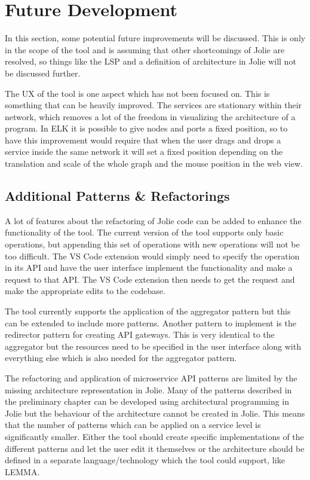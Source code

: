 \section{Future Development}
In this section, some potential future improvements will be discussed.
This is only in the scope of the tool and is assuming that other shortcomings of Jolie are resolved, so things like the LSP and a definition of architecture in Jolie will not be discussed further.

The UX of the tool is one aspect which has not been focused on. This is something that can be heavily improved.
The services are stationary within their network, which removes a lot of the freedom in visualizing the architecture of a program.
In ELK it is possible to give nodes and ports a fixed position, so to have this improvement would require that when the user drags and drops a service inside the same network it will set a fixed position depending on the translation and scale of the whole graph and the mouse position in the web view.

\subsection{Additional Patterns \& Refactorings}
A lot of features about the refactoring of Jolie code can be added to enhance the functionality of the tool.
The current version of the tool supports only basic operations, but appending this set of operations with new operations will not be too difficult.
The VS Code extension would simply need to specify the operation in its API and have the user interface implement the functionality and make a request to that API.
The VS Code extension then needs to get the request and make the appropriate edits to the codebase.

The tool currently supports the application of the aggregator pattern but this can be extended to include
more patterns. Another pattern to implement is the redirector pattern for creating API gateways.
This is very identical to the aggregator but the resources need to be specified in the user interface along with everything else which is also needed for the aggregator pattern.

The refactoring and application of microservice API patterns are limited by the missing architecture representation in Jolie.
Many of the patterns described in the preliminary chapter can be developed using architectural programming in Jolie but the behaviour of the architecture cannot be created in Jolie.
This means that the number of patterns which can be applied on a service level is significantly smaller.
Either the tool should create specific implementations of the different patterns and let the user edit it themselves or the architecture should be 
defined in a separate language/technology which the tool could support, like LEMMA.

